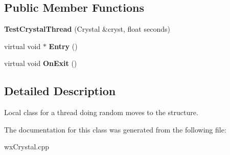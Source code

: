 \subsection*{Public Member Functions}
\begin{DoxyCompactItemize}
\item 
\mbox{\label{class_obj_cryst_1_1_test_crystal_thread_a8422d608c62cfb2701a72a7e0807c409}} 
{\bfseries Test\+Crystal\+Thread} (Crystal \&cryst, float seconds)
\item 
\mbox{\label{class_obj_cryst_1_1_test_crystal_thread_a3fc33dfbdfb57175c7bd923104e83f3d}} 
virtual void $\ast$ {\bfseries Entry} ()
\item 
\mbox{\label{class_obj_cryst_1_1_test_crystal_thread_a0de3e5026e68fee9b44e7a5a657b2498}} 
virtual void {\bfseries On\+Exit} ()
\end{DoxyCompactItemize}


\subsection{Detailed Description}
Local class for a thread doing random moves to the structure. 

The documentation for this class was generated from the following file\+:\begin{DoxyCompactItemize}
\item 
wx\+Crystal.\+cpp\end{DoxyCompactItemize}
